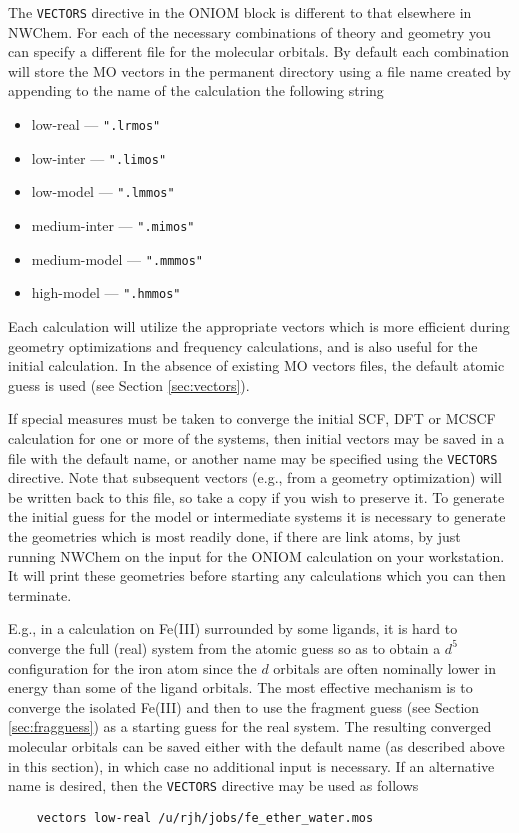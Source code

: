 The \verb+VECTORS+ directive in the ONIOM block is different to that
elsewhere in NWChem.  For each of the necessary combinations of theory
and geometry you can specify a different file for the molecular
orbitals.  By default each combination will store the MO vectors in
the permanent directory using a file name created by appending to the
name of the calculation the following string
\begin{itemize}
\item low-real  --- \verb+".lrmos"+
\item low-inter --- \verb+".limos"+
\item low-model --- \verb+".lmmos"+
\item medium-inter --- \verb+".mimos"+
\item medium-model --- \verb+".mmmos"+
\item high-model --- \verb+".hmmos"+
\end{itemize}
Each calculation will utilize the appropriate vectors which is more
efficient during geometry optimizations and frequency calculations,
and is also useful for the initial calculation.  In the absence of
existing MO vectors files, the default atomic guess is used (see
Section \ref{sec:vectors}).

If special measures must be taken to converge the initial SCF, DFT or
MCSCF calculation for one or more of the systems, then initial vectors
may be saved in a file with the default name, or another name may be
specified using the \verb+VECTORS+ directive.  Note that subsequent
vectors (e.g., from a geometry optimization) will be written back to
this file, so take a copy if you wish to preserve it.  
To generate the initial guess for the model or intermediate systems
it is necessary to generate the geometries which is most readily
done, if there are link atoms, by just running NWChem on the
input for the ONIOM calculation on your workstation.  It will
print these geometries before starting any calculations which 
you can then terminate.

E.g., in a calculation on Fe(III) surrounded by some ligands, it is
hard to converge the full (real) system from the atomic guess so as to
obtain a $d^5$ configuration for the iron atom since the $d$ orbitals
are often nominally lower in energy than some of the ligand orbitals.
The most effective mechanism is to converge the isolated Fe(III) and
then to use the fragment guess (see Section \ref{sec:fragguess}) as a
starting guess for the real system.  The resulting converged molecular
orbitals can be saved either with the default name (as described above
in this section), in which case no additional input is necessary.  If
an alternative name is desired, then the \verb+VECTORS+ directive may
be used as follows
\begin{verbatim}
    vectors low-real /u/rjh/jobs/fe_ether_water.mos
\end{verbatim}

